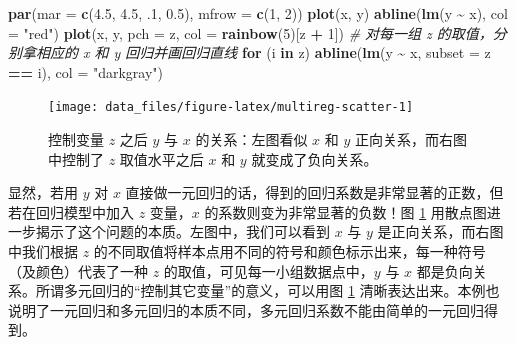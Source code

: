 \documentclass[
  b5paper,
  UTF8,twoside]{book}
\newenvironment{Shaded}{\begin{snugshade}}{\end{snugshade}}
\newcommand{\AttributeTok}[1]{\textcolor[rgb]{0.13,0.29,0.53}{#1}}
\newcommand{\CommentTok}[1]{\textcolor[rgb]{0.56,0.35,0.01}{\textit{#1}}}
\newcommand{\ControlFlowTok}[1]{\textcolor[rgb]{0.13,0.29,0.53}{\textbf{#1}}}
\newcommand{\DecValTok}[1]{\textcolor[rgb]{0.00,0.00,0.81}{#1}}
\newcommand{\FloatTok}[1]{\textcolor[rgb]{0.00,0.00,0.81}{#1}}
\newcommand{\FunctionTok}[1]{\textcolor[rgb]{0.13,0.29,0.53}{\textbf{#1}}}
\newcommand{\NormalTok}[1]{#1}
\newcommand{\SpecialCharTok}[1]{\textcolor[rgb]{0.81,0.36,0.00}{\textbf{#1}}}
\newcommand{\StringTok}[1]{\textcolor[rgb]{0.31,0.60,0.02}{#1}}
\begin{document}
\begin{Shaded}
\begin{Highlighting}[]
\FunctionTok{par}\NormalTok{(}\AttributeTok{mar =} \FunctionTok{c}\NormalTok{(}\FloatTok{4.5}\NormalTok{, }\FloatTok{4.5}\NormalTok{, .}\DecValTok{1}\NormalTok{, }\FloatTok{0.5}\NormalTok{), }\AttributeTok{mfrow =} \FunctionTok{c}\NormalTok{(}\DecValTok{1}\NormalTok{, }\DecValTok{2}\NormalTok{))}
\FunctionTok{plot}\NormalTok{(x, y)}
\FunctionTok{abline}\NormalTok{(}\FunctionTok{lm}\NormalTok{(y }\SpecialCharTok{\textasciitilde{}}\NormalTok{ x), }\AttributeTok{col =} \StringTok{"red"}\NormalTok{)}
\FunctionTok{plot}\NormalTok{(x, y, }\AttributeTok{pch =}\NormalTok{ z, }\AttributeTok{col =} \FunctionTok{rainbow}\NormalTok{(}\DecValTok{5}\NormalTok{)[z }\SpecialCharTok{+} \DecValTok{1}\NormalTok{])}
\CommentTok{\# 对每一组 z 的取值，分别拿相应的 x 和 y 回归并画回归直线}
\ControlFlowTok{for}\NormalTok{ (i }\ControlFlowTok{in}\NormalTok{ z) }\FunctionTok{abline}\NormalTok{(}\FunctionTok{lm}\NormalTok{(y }\SpecialCharTok{\textasciitilde{}}\NormalTok{ x, }\AttributeTok{subset =}\NormalTok{ z }\SpecialCharTok{==}\NormalTok{ i), }\AttributeTok{col =} \StringTok{"darkgray"}\NormalTok{)}
\end{Highlighting}
\end{Shaded}

\begin{figure}

{\centering \texttt{[image: data\_files/figure-latex/multireg-scatter-1]} 

}

\caption[控制变量 \(z\) 之后 \(y\) 与 \(x\) 的关系]{控制变量 \(z\) 之后 \(y\) 与 \(x\) 的关系：左图看似 \(x\) 和 \(y\) 正向关系，而右图中控制了 \(z\) 取值水平之后 \(x\) 和 \(y\) 就变成了负向关系。}\label{fig:multireg-scatter}
\end{figure}





显然，若用 \(y\) 对 \(x\) 直接做一元回归的话，得到的回归系数是非常显著的正数，但若在回归模型中加入 \(z\) 变量，\(x\) 的系数则变为非常显著的负数！图 \ref{fig:multireg-scatter} 用散点图进一步揭示了这个问题的本质。左图中，我们可以看到 \(x\) 与 \(y\) 是正向关系，而右图中我们根据 \(z\) 的不同取值将样本点用不同的符号和颜色标示出来，每一种符号（及颜色）代表了一种 \(z\) 的取值，可见每一小组数据点中，\(y\) 与 \(x\) 都是负向关系。所谓多元回归的``控制其它变量''的意义，可以用图 \ref{fig:multireg-scatter} 清晰表达出来。本例也说明了一元回归和多元回归的本质不同，多元回归系数不能由简单的一元回归得到。
\end{document}
